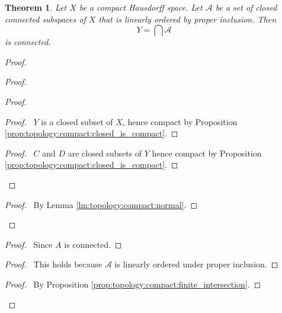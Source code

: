 \documentclass{report}
\let\qed\relax
\newtheorem{thm}[lm]{Theorem}
\theoremstyle{definition}
\begin{document}
  \begin{thm}
    Let $X$ be a compact Hausdorff space. Let $\mathcal{A}$ be a set of closed
    connected subspaces of $X$ that is linearly ordered by proper inclusion.
    Then
    \[ Y = \bigcap \mathcal{A} \]
    is connected.
  \end{thm}

  \begin{proof}
    \pf
    \begin{proof}
      \begin{proof}
        \begin{proof}
          \pf\ $Y$ is a closed subset of $X$, hence compact by Proposition
          \ref{prop:topology:compact:closed_is_compact}.
        \end{proof}
        \qedstep
        \begin{proof}
          \pf\ $C$ and $D$ are closed subsets of $Y$ hence compact by
          Proposition \ref{prop:topology:compact:closed_is_compact}.
        \end{proof}
      \end{proof}
      \qedstep
      \begin{proof}
        \pf\ By Lemma \ref{lm:topology:compact:normal}.
      \end{proof}
    \end{proof}
    \begin{proof}
      \pf\ Since $A$ is connected.
    \end{proof}
    \begin{proof}
      \pf\ This holds because $\mathcal{A}$ is linearly ordered under proper
      inclusion.
    \end{proof}
    \begin{proof}
      \pf\ By Proposition \ref{prop:topology:compact:finite_intersection}.
    \end{proof}
    \qed
  \end{proof}
\end{document}
